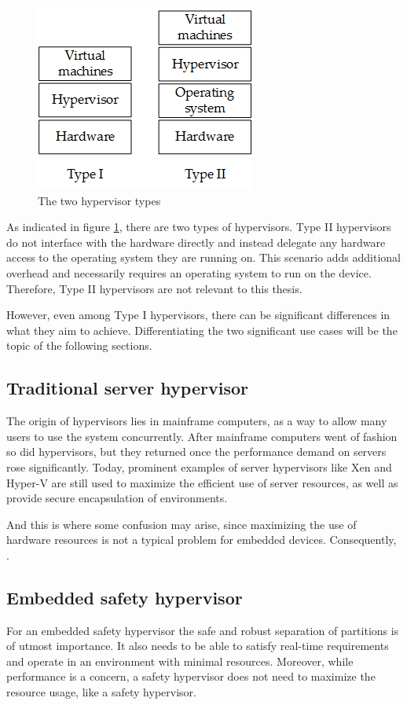 \begin{figure}
\centering
\includegraphics[scale=1]{Figures/hypervisor_types.png}
\decoRule
\caption{The two hypervisor types}
\label{fig:hypervisor_types}
\end{figure}
As indicated in figure \ref{fig:hypervisor_types}, there are two types of hypervisors. Type II hypervisors do not interface with the hardware directly and instead delegate any hardware access to the operating system they are running on. This scenario adds additional overhead and necessarily requires an operating system to run on the device. Therefore, Type II hypervisors are not relevant to this thesis.

However, even among Type I hypervisors, there can be significant differences in what they aim to achieve. Differentiating the two significant use cases will be the topic of the following sections.
\subsection{Traditional server hypervisor}
The origin of hypervisors lies in mainframe computers, as a way to allow many users to use the system concurrently. After mainframe computers went of fashion so did hypervisors, but they returned once the performance demand on servers rose significantly.
Today, prominent examples of server hypervisors like Xen and Hyper-V are still used to maximize the efficient use of server resources, as well as provide secure encapsulation of environments.

And this is where some confusion may arise, since maximizing the use of hardware resources is not a typical problem for embedded devices. Consequently, .
\subsection{Embedded safety hypervisor}
For an embedded safety hypervisor the safe and robust separation of partitions is of utmost importance. It also needs to be able to satisfy real-time requirements and operate in an environment with minimal resources. Moreover, while performance is a concern, a safety hypervisor does not need to maximize the resource usage, like a safety hypervisor.

